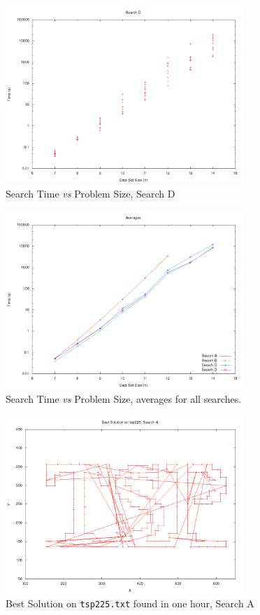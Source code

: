 \documentclass{article}
\begin{document}
\begin{figure}[p]
	\centering
	\includegraphics[width=0.8\textwidth]{../images/times_search_d.png}
	\caption{Search Time {\it vs} Problem Size, Search D}
	\label{fig:times_search_d}
\end{figure}

\begin{figure}[p]
	\centering
	\includegraphics[width=0.8\textwidth]{../images/times_avgs.png}
	\caption{Search Time {\it vs} Problem Size, averages for all searches.}
	\label{fig:times_search_a}
\end{figure}

\begin{figure}[p]
	\centering
	\includegraphics[width=0.8\textwidth]{../images/paths_search_a.png}
	\caption{Best Solution on {\tt tsp225.txt} found in one hour, Search A}
	\label{fig:paths_search_a}
\end{figure}
\end{document}
